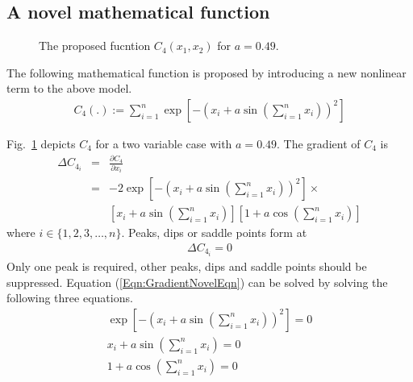 \documentclass[twocolumn]{svjour3}          %
\begin{document}
\subsection{A novel mathematical function}
\begin{figure}
	\centering
	\caption{The proposed fucntion $C_4(x_1, x_2)$ for $a = 0.49$.}
	\label{Fig:TwoVarNovelFunc}
\end{figure}
The following mathematical function is proposed by introducing a new nonlinear term to the above model.
\begin{eqnarray}
	C_4(.) := \sum_{i=1}^{n}{\exp[-\left(x_i + a\sin\left(\sum_{i=1}^{n} x_i\right)\right)^2]} \label{Eqn:Novelmodel}
\end{eqnarray}
\par
Fig.~\ref{Fig:TwoVarNovelFunc} depicts $C_4$ for a two variable case with $a=0.49$. The gradient of $C_4$ is
\begin{eqnarray}
	\Delta C_{4_i} &=& \frac{\partial C_4}{\partial x_i} \nonumber\\
	&=& -2\exp[-\left(x_i + a\sin\left(\sum_{i=1}^{n} x_i\right)\right)^2] \times \nonumber\\
	&& \left[ x_i + a\sin\left(\sum_{i=1}^{n} x_i\right) \right] \left[1 + a\cos\left(\sum_{i=1}^{n} x_i\right) \right] \label{Eqn:GradientNovelFunc}
\end{eqnarray}
where $i \in \{1, 2, 3, \dots, n\}$. Peaks, dips or saddle points form at 
\begin{eqnarray}
	\Delta C_{4_i}=0 \label{Eqn:GradientNovelEqn}
\end{eqnarray}
Only one peak is required, other peaks, dips and saddle points should be suppressed. Equation (\ref{Eqn:GradientNovelEqn}) can be solved by solving the following three equations.
\begin{eqnarray}
	\exp[-\left(x_i + a\sin\left(\sum_{i=1}^{n} x_i\right)\right)^2]=0 \label{Eqn:GradientNovelEqn1} \\
	x_i + a\sin\left(\sum_{i=1}^{n} x_i\right)=0 \label{Eqn:GradientNovelSol2} \\
	1 + a\cos\left(\sum_{i=1}^{n} x_i\right)=0 \label{Eqn:GradientNovelEqn3}
\end{eqnarray}
\end{document}
